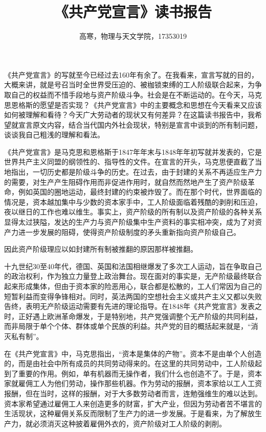 \documentclass[a4paper,11pt]{ctexart}
\author{高寒，物理与天文学院，17353019}
\date{}
\title{《共产党宣言》读书报告}
\begin{document}
\maketitle
《共产党宣言》的写就至今已经过去160年有余了。在我看来，宣言写就的目的，大概来讲，就是号召当时全世界受压迫的、被枷锁束缚的工人阶级联合起来，为争取自己的权益而不惜手段地与资产阶级斗争。社会是在不断运动的。在今天，马克思恩格斯的愿望是否实现？《共产党宣言》中的主要概念和思想在今天看来又应该如何被理解和看待？今天广大劳动者的现状又有何差异？在这篇读书报告中，我希望就宣言原文内容，结合当代国内外社会现状，特别是宣言中谈到的所有制问题，谈谈我自己粗浅的理解和看法。\par
《共产党宣言》是马克思和恩格斯于1847年年末与1848年年初写就并发表的，它是世界共产主义同盟的纲领性的、指导性的文件。在宣言的开头，马克思便直截了当地指出，一切历史都是阶级斗争的历史。在过去，由于封建的关系不再适应生产力的需要，对生产产生阻碍作用而非促进作用时，就自然而然地产生了资产阶级革命，例如英国的圈地运动，最终封建的约束被炸毁了。而在那个时代，世界面临的情况是，资本越加集中与少数的资本家手中，工人阶级面临着残酷的剥削和压迫，夜以继日的工作也难以维生。事实上，资产阶级的所有制以及资产阶级的各种关系显得太过狭隘，发达的生产力与资产阶级集中生产资料的事实相冲突，成为了对资产力进一步发展的阻碍，使得资产阶级制度的矛头重新指向资产阶级自己。\par
因此资产阶级理应以如封建所有制被推翻的原因那样被推翻。\par
十九世纪30至40年代，德国、英国和法国相继爆发了多次工人运动，旨在争取自己的政治权利，作为独立力量登上政治舞台。现在面对的事实是，无产阶级最终联合起来形成集体，但由于资本家的险恶用心，联合都是松散的，工人们常因为自己的短暂利益而变得争锋相对。同时，英法两国的空想社会主义或共产主义又都以失败告终，表明无产阶级运动需要有先进的理论指导。在1848年《共产党宣言》发表之时，正好遇上欧洲革命爆发，于是特别地，共产党强调整个无产阶级的共同利益，而非局限于单个个体、群体或单个民族的利益。共产党的目的概括起来就是，“消灭私有制”。\par
在《共产党宣言》中，马克思指出，“资本是集体的产物”。资本不是由单个人创造的，而是由社会中所有成员的共同劳动得来的。在这里的共同劳动中，工人阶级起到了重要的作用。例如，单有机器而无操作者，我们什么也创造不了。于是，资本家就雇佣工人为他们劳动，操作那些机器。作为劳动的报酬，资本家给以工人工资报酬，但在当时，这样的报酬，对于大多数劳动者而言，连勉强维生的难以达到。资本家希望通过雇佣工人来创造更多的财富，扩大产业，但因为劳动者苦不堪言的生活现状，这种雇佣关系反而限制了生产力的进一步发展。于是看来，为了解放生产力，就必须消灭这种披着雇佣外衣的，资产阶级对工人阶级的剥削。\par
\end{document}

